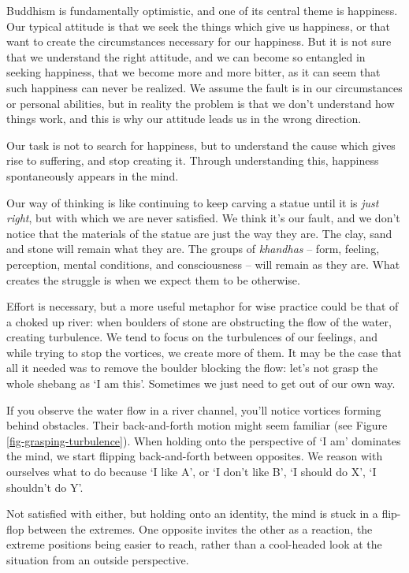 
Buddhism is fundamentally optimistic, and one of its central theme is
happiness. Our typical attitude is that we seek the things which give us
happiness, or that want to create the circumstances necessary for our
happiness. But it is not sure that we understand the right attitude, and
we can become so entangled in seeking happiness, that we become more and
more bitter, as it can seem that such happiness can never be realized.
We assume the fault is in our circumstances or personal abilities, but
in reality the problem is that we don't understand how things work, and
this is why our attitude leads us in the wrong direction.

Our task is not to search for happiness, but to understand the cause
which gives rise to suffering, and stop creating it. Through
understanding this, happiness spontaneously appears in the mind.

Our way of thinking is like continuing to keep carving a statue until it
is \emph{just right}, but with which we are never satisfied. We think
it's our fault, and we don't notice that the materials of the statue are
just the way they are. The clay, sand and stone will remain what they
are. The groups of \emph{khandhas} -- form, feeling, perception, mental
conditions, and consciousness -- will remain as they are. What creates
the struggle is when we expect them to be otherwise.

Effort is necessary, but a more useful metaphor for wise practice could
be that of a choked up river: when boulders of stone are obstructing the
flow of the water, creating turbulence. We tend to focus on the
turbulences of our feelings, and while trying to stop the vortices, we
create more of them. It may be the case that all it needed was to remove
the boulder blocking the flow: let's not grasp the whole shebang as `I
am this'. Sometimes we just need to get out of our own way.

If you observe the water flow in a river channel, you'll notice vortices
forming behind obstacles. Their back-and-forth motion might seem
familiar (see Figure \ref{fig-grasping-turbulence}). When holding onto
the perspective of `I am' dominates the mind, we start flipping
back-and-forth between opposites. We reason with ourselves what to do
because `I like A', or `I don't like B', `I should do X', `I shouldn't
do Y'.

Not satisfied with either, but holding onto an identity, the mind is
stuck in a flip-flop between the extremes. One opposite invites the
other as a reaction, the extreme positions being easier to reach, rather
than a cool-headed look at the situation from an outside perspective.

